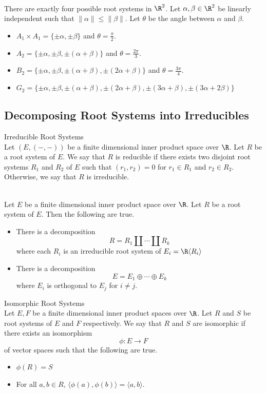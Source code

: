 \documentclass[a4paper]{article}
\begin{document}
\begin{prp}{}{} \\There are exactly four possible root systems in $\R^2$. Let $\alpha,\beta\in\R^2$ be linearly independent such that $\|\alpha\|\leq\|\beta\|$. Let $\theta$ be the angle between $\alpha$ and $\beta$. 
\begin{itemize}
\item $A_1\times A_1=\{\pm\alpha,\pm\beta\}$ and $\theta=\frac{\pi}{2}$. 
\item $A_2=\{\pm\alpha,\pm\beta,\pm(\alpha+\beta)\}$ and $\theta=\frac{2\pi}{3}$. 
\item $B_2=\{\pm\alpha,\pm\beta,\pm(\alpha+\beta),\pm(2\alpha+\beta)\}$ and $\theta=\frac{3\pi}{4}$. 
\item $G_2=\{\pm\alpha,\pm\beta,\pm(\alpha+\beta),\pm(2\alpha+\beta),\pm(3\alpha+\beta),\pm(3\alpha+2\beta)\}$
\end{itemize}
\end{prp}

\subsection{Decomposing Root Systems into Irreducibles}
\begin{defn}{Irreducible Root Systems}{} \\Let $(E,(-,-))$ be a finite dimensional inner product space over $\R$. Let $R$ be a root system of $E$. We say that $R$ is reducible if there exists two disjoint root systems $R_1$ and $R_2$ of $E$ such that $(r_1,r_2)=0$ for $r_1\in R_1$ and $r_2\in R_2$. Otherwise, we say that $R$ is irreducible. 
\end{defn}

\begin{prp}{}{} \\Let $E$ be a finite dimensional inner product space over $\R$. Let $R$ be a root system of $E$. Then the following are true. 
\begin{itemize}
\item There is a decomposition $$R=R_1\amalg\cdots\amalg R_k$$ where each $R_i$ is an irreducible root system of $E_i=\R\langle R_i\rangle$
\item There is a decomposition $$E=E_1\oplus\cdots\oplus E_k$$ where $E_i$ is orthogonal to $E_j$ for $i\neq j$. 
\end{itemize}
\end{prp}

\begin{defn}{Isomorphic Root Systems}{} \\Let $E,F$ be a finite dimensional inner product spaces over $\R$. Let $R$ and $S$ be root systems of $E$ and $F$ respectively. We say that $R$ and $S$ are isomorphic if there exists an isomorphism $$\phi:E\to F$$ of vector spaces such that the following are true. 
\begin{itemize}
\item $\phi(R)=S$
\item For all $a,b\in R$, $\langle\phi(a),\phi(b)\rangle=\langle a,b\rangle$. 
\end{itemize}
\end{defn}
\end{document}
